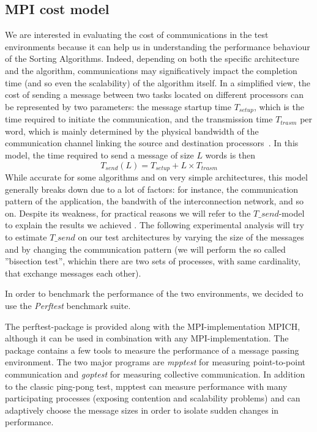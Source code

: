 \subsection{MPI cost model}
\label{MPI-cost-model}
We are interested in evaluating the cost of communications in the test environments because it can help us in understanding the performance behaviour of the Sorting Algorithms. Indeed, depending on both the specific architecture and the algorithm, communications may significatively impact the completion time (and so even the scalability) of the algorithm itself. In a simplified view, the cost of sending a message between two tasks located on different processors can be represented by two parameters: the message startup time $T_{setup}$, which is the time required to initiate the communication, and the transmission time $T_{trasm}$ per word, which is mainly determined by the physical bandwidth of the communication channel linking the source and destination processors~\cite{VANN}. In this model, the time required to send a message of size $L$ words is then
\[
T_{send}(L) = T_{setup} + L \times T_{trasm}
\]
While accurate for some algorithms and on very simple architectures, this model generally breaks down due to a lot of factors: for instance, the communication pattern of the application, the bandwith of the interconnection network, and so on. Despite its weakness, for practical reasons we will refer to the $T\_send$-model to explain the results we achieved .  
The following experimental analysis will try to estimate $T\_send$ on our test architectures by varying the size of the messages and by changing the communication pattern (we will perform the so called ''bisection test'', whichin there are two sets of processes, with same cardinality, that exchange messages each other). 

In order to benchmark the performance of the two environments, we decided to use the \textit{Perftest} benchmark suite.

The perftest-package is provided along with the MPI-implementation MPICH, although it can be used in combination with any MPI-implementation. The package contains a few tools to measure the performance of a message passing environment. The two major programs are \textit{mpptest} for measuring point-to-point communication and \textit{goptest} for measuring collective communication. In addition to the classic ping-pong test, mpptest can measure performance with many participating processes (exposing contention and scalability problems) and can adaptively choose the message sizes in order to isolate sudden changes in performance. 

